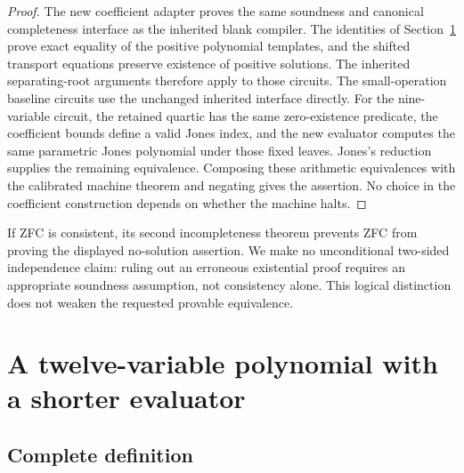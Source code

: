\documentclass[11pt]{article}
\begin{document}
\begin{proof}
The new coefficient adapter proves the same soundness and canonical
completeness interface as the inherited blank compiler. The identities of
Section~\ref{sec:norm} prove exact equality of the positive polynomial templates,
and the shifted transport equations preserve existence of positive solutions.
The inherited separating-root arguments therefore apply to those circuits.
The small-operation baseline circuits use the unchanged inherited interface
directly. For the nine-variable circuit, the retained quartic has the same
zero-existence predicate, the coefficient bounds define a valid Jones index,
and the new evaluator computes the same parametric Jones polynomial under
those fixed leaves. Jones's reduction supplies the remaining equivalence.
Composing these arithmetic equivalences with the calibrated machine theorem
and negating gives the assertion. No choice in the coefficient construction
depends on whether the machine halts.
\end{proof}

If ZFC is consistent, its second incompleteness theorem prevents ZFC from
proving the displayed no-solution assertion. We make no unconditional
two-sided independence claim: ruling out an erroneous existential proof
requires an appropriate soundness assumption, not consistency alone. This
logical distinction does not weaken the requested provable equivalence.

\section{A twelve-variable polynomial with a shorter evaluator}\label{sec:norm}

\subsection{Complete definition}
\end{document}
